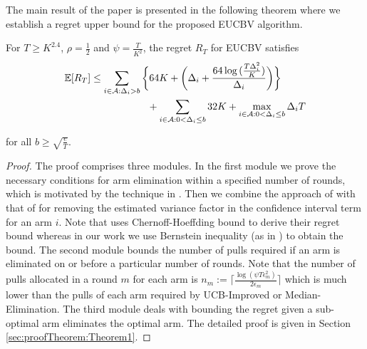 The main result of the paper is presented in the following theorem where we establish a regret upper bound for the proposed EUCBV  algorithm. 
\begin{theorem}
\label{Result:Theorem:1}
For $T\geq K^{2.4}$, $\rho=\frac{1}{2}$ and $\psi=\frac{T}{K^2}$, the regret $R_T$ for EUCBV satisfies
\begin{align*}
\E [R_{T}] & \leq \sum\limits_{i\in \A :\Delta_{i} > b}\bigg\lbrace 64 K + \bigg(\Delta_{i}+\dfrac{64\log{(\frac{T\Delta_{i}^{2}}{K})}}{\Delta_{i}}\bigg)\bigg \rbrace \\
 & \hspace{20mm}+\sum\limits_{i\in \A :0 < \Delta_{i}\leq b} 32 K + \max_{i\in \A :0 < \Delta_{i}\leq b}\Delta_{i}T  
\end{align*}

for all $b\geq\sqrt{\frac{e}{T}}$. 
\end{theorem}

\begin{proof}
The proof comprises three modules. In the first module we prove the necessary conditions for arm elimination within a specified number of rounds, which is motivated by the technique in \cite{auer2010ucb}. 
Then we combine the approach of \cite{audibert2009exploration} with that of  \cite{auer2010ucb} for removing the estimated variance factor in the confidence interval term for an arm $i$. Note that  \cite{auer2010ucb} uses Chernoff-Hoeffding bound to derive their regret bound whereas in our work we use  Bernstein inequality (as in \cite{audibert2009exploration}) to obtain the bound. The second module bounds the number of pulls required if an arm is eliminated on or before a particular number of rounds. Note that the number of pulls allocated in a round $m$ for each arm is $n_{m}:=\bigg\lceil\frac{\log{(\psi T\epsilon_{m}^{2})}}{2\epsilon_{m}}\bigg\rceil$ which is much lower than the pulls of each arm required by UCB-Improved or Median-Elimination. The third module deals with bounding the regret given a sub-optimal arm eliminates the optimal arm. The detailed proof is given in Section \ref{sec:proofTheorem:Theorem1}.
\end{proof}

